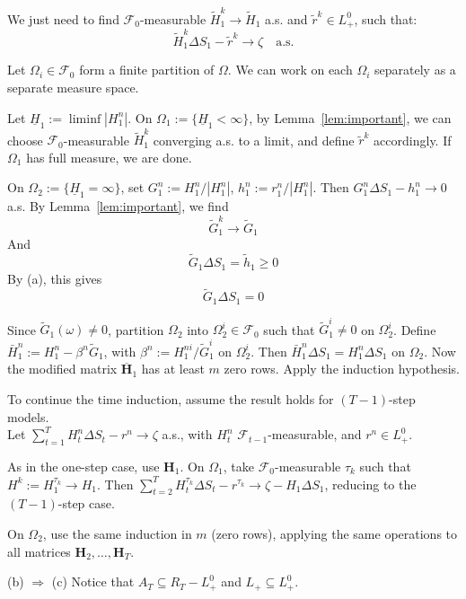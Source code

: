 \documentclass[review]{elsarticle}
\begin{document}
We just need to find $\mathcal{F}_0$-measurable $\tilde{H}_1^k \to \tilde{H}_1$ a.s. and $\tilde{r}^k \in L_+^0$, such that:
$$
\tilde{H}_1^k \Delta S_1 - \tilde{r}^k \to \zeta \quad \text{a.s.}
$$

Let $\Omega_i \in \mathcal{F}_0$ form a finite partition of $\Omega$.  
We can work on each $\Omega_i$ separately as a separate measure space.

Let $\underline{H}_1 := \liminf |H_1^n|$.  
On $\Omega_1 := \{\underline{H}_1 < \infty\}$, by Lemma~\ref{lem:important}, we can choose $\mathcal{F}_0$-measurable $\tilde{H}_1^k$ converging a.s. to a limit, and define $\tilde{r}^k$ accordingly.  
If $\Omega_1$ has full measure, we are done.

On $\Omega_2 := \{\underline{H}_1 = \infty\}$, set  
$G_1^n := H_1^n / |H_1^n|$, $h_1^n := r_1^n / |H_1^n|$.  
Then $G_1^n \Delta S_1 - h_1^n \to 0$ a.s.  
By Lemma~\ref{lem:important}, we find\\
$$\tilde{G}_1^k \to \tilde{G}_1$$ And $$\tilde{G}_1 \Delta S_1 = \tilde{h}_1 \geq 0$$  
By (a), this gives $$\tilde{G}_1 \Delta S_1 = 0$$

Since $\tilde{G}_1(\omega) \neq 0$, partition $\Omega_2$ into $\Omega_2^i \in \mathcal{F}_0$ such that $\tilde{G}_1^i \neq 0$ on $\Omega_2^i$.  
Define $\bar{H}_1^n := H_1^n - \beta^n \tilde{G}_1$, with  
$\beta^n := H_1^{ni} / \tilde{G}_1^i$ on $\Omega_2^i$.  
Then $\bar{H}_1^n \Delta S_1 = H_1^n \Delta S_1$ on $\Omega_2$.  
Now the modified matrix $\overline{\mathbf{H}}_1$ has at least $m$ zero rows.  
Apply the induction hypothesis.

\bigskip

\hspace{0.5cm}To continue the time induction, assume the result holds for $(T-1)$-step models. 
\\
Let $\sum_{t=1}^T H_t^n \Delta S_t - r^n \to \zeta$ a.s., with $H_t^n$ $\mathcal{F}_{t-1}$-measurable, and $r^n \in L_+^0$.

As in the one-step case, use $\mathbf{H}_1$.  
On $\Omega_1$, take $\mathcal{F}_0$-measurable $\tau_k$ such that $H^k := H_1^{\tau_k} \to H_1$.  
Then $\sum_{t=2}^T H_t^{\tau_k} \Delta S_t - r^{\tau_k} \to \zeta - H_1 \Delta S_1$,  
reducing to the $(T-1)$-step case.

On $\Omega_2$, use the same induction in $m$ (zero rows), applying the same operations to all matrices $\mathbf{H}_2, \ldots, \mathbf{H}_T$.



\hspace{0.5cm}(b) $\Rightarrow$ (c) Notice that $A_T \subseteq R_T-L_{+}^0$ and $L_{+} \subseteq L_{+}^0$.
\end{document}
